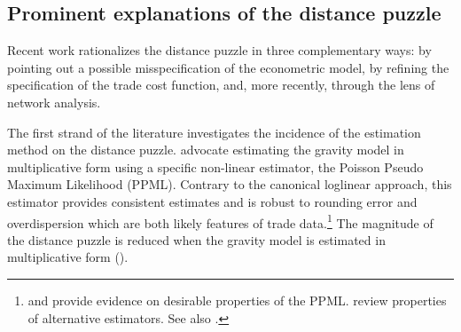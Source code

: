 \documentclass[12pt,twoside,a4paper,notitlepage]{article}
\begin{document}

\subsection*{Prominent explanations of the distance puzzle}
Recent work rationalizes the distance puzzle in three complementary ways: by pointing out a possible misspecification of the econometric model, by refining the specification of the trade cost function, and, more recently, through the lens of network analysis.

The first strand of the literature investigates the incidence of the estimation method on the distance puzzle.
\cite{SantosSilva2006} advocate estimating the gravity model in multiplicative form using a specific non-linear estimator, the Poisson Pseudo Maximum Likelihood (PPML).
Contrary to the canonical loglinear approach, this estimator provides consistent estimates and is robust to rounding error and overdispersion which are both likely features of trade data.\footnote{\cite{SantosSilva2011} and \cite{Fally2015} provide evidence on desirable properties of the PPML.
\cite{Head2014} review properties of alternative estimators.
See also \cite{Bosquet2015,Bosquet2014}.}
The magnitude of the distance puzzle is reduced when the gravity model is estimated in multiplicative form (\cite{Bosquet2015, Head2013}).
\end{document}
